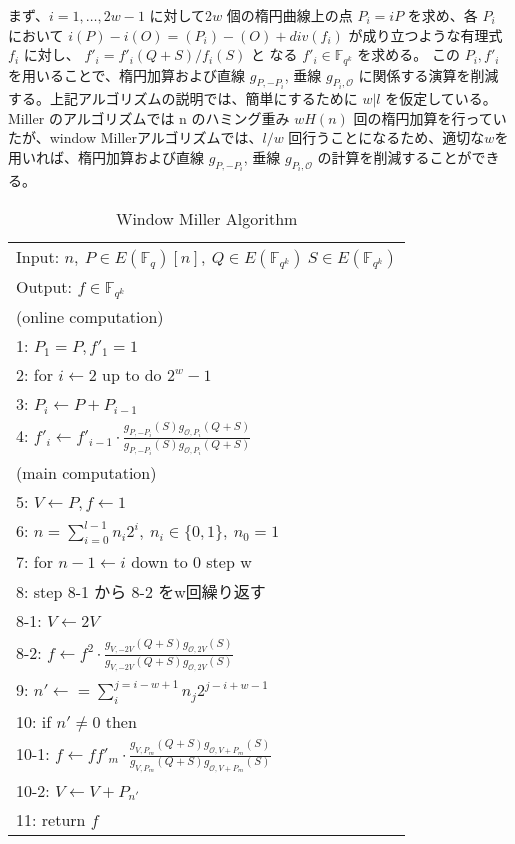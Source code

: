 まず、$i=1,\ldots,2w-1$ に対して2$w$ 個の楕円曲線上の点 $P_i = iP$ を求め、各 $P_i$ において
$i(P) − i(O) = (P _i) − (O) + div(f _i)$ が成り立つような有理式 $f _i$ に対し、
$f' _i  = f' _i(Q + S) /f _i(S)$ と
なる $f' _i ∈ \mathbb{F}_{q^k}$ を求める。
この $P_i, f' _i$ を用いることで、楕円加算および直線 $g _{P, -P_i}$, 垂線 $g _{P_i , \mathcal{O}}$
に関係する演算を削減する。上記アルゴリズムの説明では、簡単にするために $w|l$ を仮定している。
 Miller のアルゴリズムでは n のハミング重み $wH (n)$ 回の楕円加算を行っていたが、window Millerアルゴリズムでは、$l/w$ 回行うことになるため、適切な$w$を用いれば、楕円加算および直線 $g _{P, -P_i}$, 垂線 $g _{P_i, \mathcal{O}}$ の計算を削減することができる。
\par

\begin{table}[htbp]
 \begin{center}
  \begin{tabular}{|l|}
     \hline
     Input: $n, \ P \in E(\mathbb{F}_q)[n], \ Q \in E(\mathbb{F}_{q^k}) \ S \in E(\mathbb{F}_{q^k})$ \\
     Output: $f \in \mathbb{F}_{q^k}$  \\
     \hline
     (online computation) \\
     1: \quad $P_1 = P, f'_1=1 $\\
     2: \quad for $i \gets 2$ up to do $2^w -1$\\
     3: \quad \quad $P_i \gets P + P_{i-1} $\\
     4: \quad \quad $f'_i \gets f'_{i-1} \cdot \frac{g_{P,-P_i}(S)g_{\mathcal{O},P_i}(Q+S)}{g_{P,-P_i}(S)g_{\mathcal{O},P_i}(Q+S)}$\\

     (main computation) \\
     5: \quad $V \gets P, f \gets 1 $\\
     6: \quad $n=\sum^{l - 1}_{i=0} n_i 2^i, \ n_i \in \{0,1\},\ n_0 = 1$\\

     7: \quad for $ n-1 \gets i$ down to 0 step w\\
     8: \quad step 8-1 から 8-2 をw回繰り返す\\
     8-1: \quad\quad $V \gets 2V $\\
     8-2: \quad \quad $f \gets f^2 \cdot \frac{g_{V,-2V}(Q+S)g_{\mathcal{O},2V}(S)}{g_{V,-2V}(Q+S)g_{\mathcal{O},2V}(S)}$\\

     9: \quad $n' \gets =\sum^{j=i-w+1}_{i} n_{j}2^{j-i+w-1} $\\
     10: \quad if $n' \neq 0$ then\\
     10-1: \quad \quad $f \gets ff'_m \cdot \frac{g_{V,P_m}(Q+S)g_{\mathcal{O},V+P_m}(S)}{g_{V,P_m}(Q+S)g_{\mathcal{O},V+P_m}(S)}$ \\
     10-2: \quad \quad $V \gets V + P_{n'} $\\
     11: \quad return $f$\\
     \hline
   \end{tabular}
 \end{center}
 \caption{Window Miller Algorithm}
\end{table}

